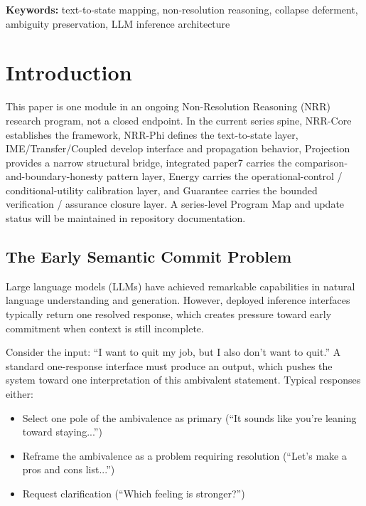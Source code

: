 \documentclass[11pt,a4paper]{article}
\begin{document}
\noindent\textbf{Keywords:} text-to-state mapping, non-resolution reasoning, collapse deferment, 
ambiguity preservation, LLM inference architecture

\section{Introduction}
\label{sec:intro}

This paper is one module in an ongoing Non-Resolution Reasoning (NRR) research program, not a closed endpoint. In the current series spine, NRR-Core establishes the framework, NRR-Phi defines the text-to-state layer, IME/Transfer/Coupled develop interface and propagation behavior, Projection provides a narrow structural bridge, integrated paper7 carries the comparison-and-boundary-honesty pattern layer, Energy carries the operational-control / conditional-utility calibration layer, and Guarantee carries the bounded verification / assurance closure layer. A series-level Program Map and update status will be maintained in repository documentation.

\subsection{The Early Semantic Commit Problem}

Large language models (LLMs) have achieved remarkable capabilities in natural language 
understanding and generation. However, deployed inference interfaces typically return
one resolved response, which creates pressure toward early commitment when context is
still incomplete.

Consider the input: ``I want to quit my job, but I also don't want to quit.'' 
A standard one-response interface must produce an output, which pushes the system toward
one interpretation of this ambivalent statement. Typical responses either:
\begin{itemize}
    \item Select one pole of the ambivalence as primary (``It sounds like you're leaning toward staying...'')
    \item Reframe the ambivalence as a problem requiring resolution (``Let's make a pros and cons list...'')
    \item Request clarification (``Which feeling is stronger?'')
\end{itemize}
\end{document}
